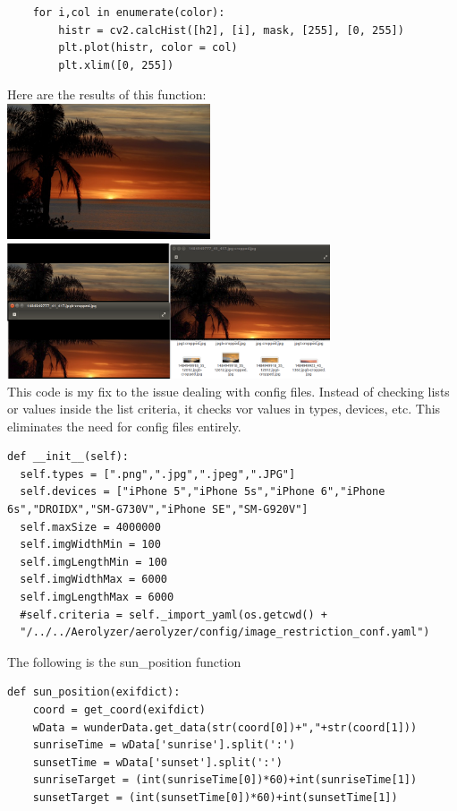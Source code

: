 \documentclass[onecolumn, draftclsnofoot,10pt, compsoc]{IEEEtran}
\begin{document}
\begin{singlespace}
\begin{lstlisting}
	for i,col in enumerate(color):
		histr = cv2.calcHist([h2], [i], mask, [255], [0, 255])
		plt.plot(histr, color = col)
		plt.xlim([0, 255])
			\end{lstlisting}	
			Here are the results of this function:\\
			\includegraphics[height=4cm,natwidth=640,natheight=426]{images/horizon_uncropped.jpg}\\
			\includegraphics[height=4cm,natwidth=1281,natheight=537]{images/horizon_cropped.png}\\
			
			This code is my fix to the issue dealing with config files. 
			Instead of checking lists or values inside the list criteria, it checks vor values in types, devices, etc.
			This eliminates the need for config files entirely.
			\begin{lstlisting}
def __init__(self):
  self.types = [".png",".jpg",".jpeg",".JPG"]
  self.devices = ["iPhone 5","iPhone 5s","iPhone 6","iPhone 6s","DROIDX","SM-G730V","iPhone SE","SM-G920V"]
  self.maxSize = 4000000
  self.imgWidthMin = 100
  self.imgLengthMin = 100
  self.imgWidthMax = 6000
  self.imgLengthMax = 6000
  #self.criteria = self._import_yaml(os.getcwd() + 
  "/../../Aerolyzer/aerolyzer/config/image_restriction_conf.yaml")
			\end{lstlisting}

			The following is the sun\_position function
			\begin{lstlisting}
def sun_position(exifdict):
	coord = get_coord(exifdict)
	wData = wunderData.get_data(str(coord[0])+","+str(coord[1]))
	sunriseTime = wData['sunrise'].split(':')
	sunsetTime = wData['sunset'].split(':')
	sunriseTarget = (int(sunriseTime[0])*60)+int(sunriseTime[1])
	sunsetTarget = (int(sunsetTime[0])*60)+int(sunsetTime[1])


\end{lstlisting}
\end{singlespace}
\end{document}
